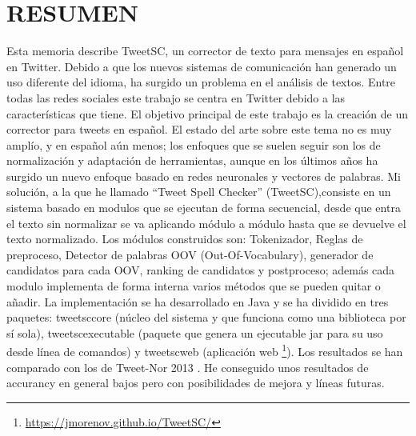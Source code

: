 \documentclass[spanish,12pt, a4paper,twoside]{paper}
\let\oldsection\section
\def\section{\cleardoublepage\oldsection}
\newcommand\blankpage{%
    \null
    \thispagestyle{empty}%
    \addtocounter{page}{-1}%
    \newpage}
\begin{document}
\afterpage{\blankpage}

\section*{RESUMEN}
Esta memoria describe TweetSC, un corrector de texto para mensajes en español en Twitter. Debido a que los nuevos sistemas de comunicación han generado un uso diferente del idioma, ha surgido un problema en el análisis de textos. Entre todas las redes sociales este trabajo se centra en Twitter debido a las características que tiene. El objetivo principal de este trabajo es la creación de un corrector para tweets en español. El estado del arte sobre este tema no es muy amplío, y en español aún menos; los enfoques que se suelen seguir son los de normalización y adaptación de herramientas, aunque en los últimos años ha surgido un nuevo enfoque basado en redes neuronales y vectores de palabras. Mi solución, a la que he llamado ``Tweet Spell Checker'' (TweetSC),consiste en un sistema basado en modulos que se ejecutan de forma secuencial, desde que entra el texto sin normalizar se va aplicando módulo a módulo hasta que se devuelve el texto normalizado. Los módulos construidos son: Tokenizador, Reglas de preproceso, Detector de  palabras OOV (Out-Of-Vocabulary), generador de candidatos para cada OOV, ranking de candidatos y postproceso; además cada modulo implementa de forma interna varios métodos que se pueden quitar o añadir. La implementación se ha desarrollado en Java y se ha dividido en tres paquetes: tweetsccore (núcleo del sistema y que funciona como una biblioteca por sí sola), tweetscexecutable (paquete que genera un ejecutable jar para su uso desde línea de comandos) y tweetscweb (aplicación web \footnote{\url{https://jmorenov.github.io/TweetSC/}}). Los resultados se han comparado con los de Tweet-Nor 2013 \cite{alegria:2013}. He conseguido unos resultados de accurancy en general bajos pero con posibilidades de mejora y líneas futuras. 


\end{document}
